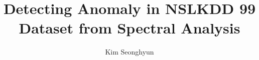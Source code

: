 \makeatletter
\title{Detecting Anomaly in NSL­KDD 99 Dataset from Spectral Analysis} \let\Title\@title
\author{Kim Seonghyun} \let\Author\@author
\department{} %
\makeatother
\renewcommand{\degreetext}{}
\titlepage
%
%

\tableofcontents
\listoffigures
\listoftables
